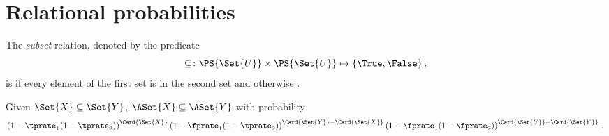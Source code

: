 \section{Relational probabilities}

The \emph{subset} relation, denoted by the predicate
\begin{equation}
    \subseteq \colon \PS{\Set{U}} \times \PS{\Set{U}} \mapsto 
    \{\True,\False\}\,,
\end{equation}
is \True if every element of the first set is in the second set and otherwise
\False.

\begin{theorem}
Given $\Set{X} \subseteq \Set{Y}$, $\ASet{X} \subseteq \ASet{Y}$ with probability
\begin{equation}
    \left(1 - \tprate_1(1 - \tprate_2)\right)^{\Card{\Set{X}}}
    \left(1 - \fprate_1(1 - \tprate_2)\right)^{\Card{\Set{Y}} - \Card{\Set{X}}}
    \left(1 - \fprate_1(1 - \fprate_2)\right)^{\Card{\Set{U}} - 
    \Card{\Set{Y}}}\,.
\end{equation}
\end{theorem}
